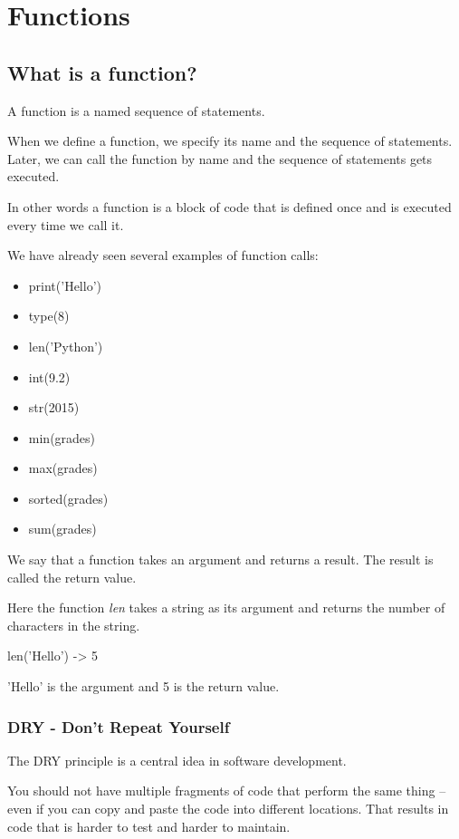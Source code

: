 \documentclass{article}
\begin{document}
\section{Functions}
\subsection{What is a function?}

A function is a named sequence of statements.

When we define a function, we specify its name and the sequence of statements. Later, we can call the function by name and the sequence of statements gets executed.

In other words a function is a block of code that is defined once and is executed every time we call it.

We have already seen several  examples of function calls:

\begin{itemize}

\item print('Hello')
\item type(8) 
\item len('Python')
\item int(9.2)
\item str(2015) 
\item min(grades)
\item max(grades)
\item sorted(grades)
\item sum(grades)
\end{itemize}

We say that a function takes an argument and returns a result. The result is called the return value.

Here the function \textit{len} takes a string as its argument and returns the number of characters in the string.

len('Hello') -> 5

'Hello' is the argument and 5 is the return value.

\subsubsection{DRY - Don't Repeat Yourself}


The DRY principle is a central idea in software development.

You should not have multiple fragments of code that perform the same thing – even if you can copy and paste the code into different locations.  That results in code that is harder to test and harder to maintain.
\end{document}
